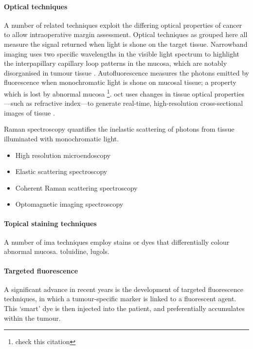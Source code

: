 \paragraph{Optical techniques}
A number of related techniques exploit the differing optical properties of cancer to allow intraoperative margin assessment.
Optical techniques as grouped here all measure the signal returned when light is shone on the target tissue.
Narrowband imaging uses two specific wavelengths in the visible light spectrum to highlight the interpapillary capillary loop patterns in the mucosa, which are notably disorganised in tumour tissue \cite{vuEfficacyNarrowBand2014}.
Autofluorescence measures the photons emitted by fluorescence when monochromatic light is shone on mucosal tissue; a property which is lost by abnormal mucosa \cite{leey.-j.IntraoperativeFluorescenceGuidedSurgery2020}\footnote{check this citation}.
\Gls{oct} uses changes in tissue optical properties---such as refractive index---to generate real-time, high-resolution cross-sectional images of tissue \cite{heidaria.e.UseOpticalCoherence2020}.

Raman spectroscopy quantifies the inelastic scattering of photons from tissue illuminated with monochromatic light.

\begin{itemize}
\item High resolution microendoscopy
\item Elastic scattering spectroscopy
\item Coherent Raman scattering spectroscopy 
\item Optomagnetic imaging spectroscopy
\end{itemize}

\paragraph{Topical staining techniques}
A number of \gls{ima} techniques employ stains or dyes that differentially colour abnormal mucosa.
toluidine, lugols.

\paragraph{Targeted fluorescence}
A significant advance in recent years is the development of targeted fluorescence techniques, in which a tumour-specific marker is linked to a fluorescent agent. 
This `smart' dye is then injected into the patient, and preferentially accumulates within the tumour. 


